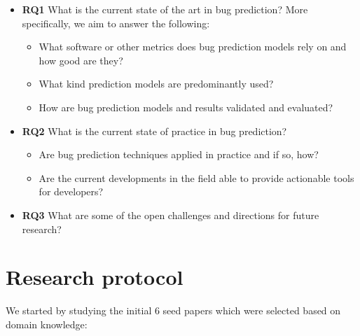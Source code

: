 \documentclass[]{book}
\providecommand{\tightlist}{%
  \setlength{\itemsep}{0pt}\setlength{\parskip}{0pt}}
\begin{document}
\begin{itemize}
\tightlist
\item
  \textbf{RQ1} What is the current state of the art in bug prediction?
  More specifically, we aim to answer the following:

  \begin{itemize}
  \tightlist
  \item
    What software or other metrics does bug prediction models rely on
    and how good are they?
  \item
    What kind prediction models are predominantly used?
  \item
    How are bug prediction models and results validated and evaluated?
  \end{itemize}
\item
  \textbf{RQ2} What is the current state of practice in bug prediction?

  \begin{itemize}
  \tightlist
  \item
    Are bug prediction techniques applied in practice and if so, how?
  \item
    Are the current developments in the field able to provide actionable
    tools for developers?
  \end{itemize}
\item
  \textbf{RQ3} What are some of the open challenges and directions for
  future research?
\end{itemize}

\section{Research protocol}\label{research-protocol-1}

We started by studying the initial 6 seed papers which were selected
based on domain knowledge:
\end{document}
